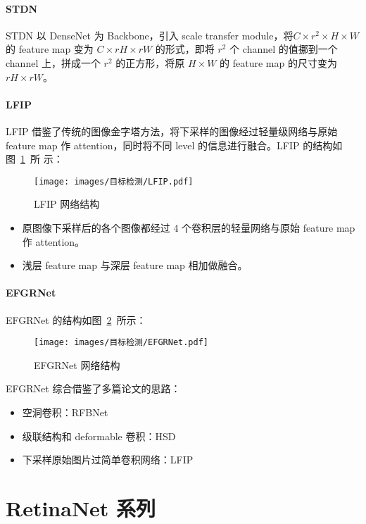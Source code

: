 \paragraph{STDN}
STDN 以 DenseNet 为 Backbone，引入 scale transfer module，将$C \times r^2 \times
H \times W$ 的 feature map 变为 $C \times rH \times rW$ 的形式，即将 $r^2$ 个
channel 的值挪到一个 channel 上，拼成一个 $r^2$ 的正方形，将原 $H \times
W$ 的 feature map 的尺寸变为 $rH \times rW$。

\paragraph{LFIP}
LFIP 借鉴了传统的图像金字塔方法，将下采样的图像经过轻量级网络与原始 feature map
作 attention，同时将不同 level 的信息进行融合。LFIP 的结构如图~\ref{fig:LFIP}~所
示：

\begin{figure}[ht]
  \centering
  \texttt{[image: images/目标检测/LFIP.pdf]}
  \caption{LFIP 网络结构}
  \label{fig:LFIP}
\end{figure}

\begin{itemize}
  \item 原图像下采样后的各个图像都经过 4 个卷积层的轻量网络与原始 feature map 作 attention。
  \item 浅层 feature map 与深层 feature map 相加做融合。
\end{itemize}

\paragraph{EFGRNet}
EFGRNet 的结构如图~\ref{fig:EFGRNet}~所示：

\begin{figure}[ht]
  \centering
  \texttt{[image: images/目标检测/EFGRNet.pdf]}
  \caption{EFGRNet 网络结构}
  \label{fig:EFGRNet}
\end{figure}

EFGRNet 综合借鉴了多篇论文的思路：
\begin{itemize}
  \item 空洞卷积：RFBNet 
  \item 级联结构和 deformable 卷积：HSD
  \item 下采样原始图片过简单卷积网络：LFIP
\end{itemize}

\section{RetinaNet 系列}
